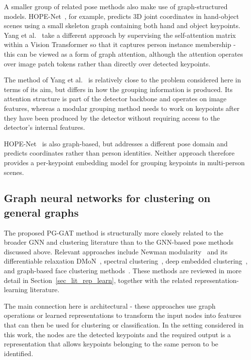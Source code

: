 A smaller group of related pose methods also make use of graph-structured models.
HOPE-Net~\cite{doosti2020hopenet}, for example,
predicts 3D joint coordinates in hand-object scenes
using a small skeleton graph containing both hand and object keypoints.
Yang et al.~\cite{yang2023instanceaware} take a different approach
by supervising the self-attention matrix within a Vision Transformer
so that it captures person instance membership -
this can be viewed as a form of graph attention,
although the attention operates over image patch tokens rather than directly over detected keypoints.

The method of Yang et al.~\cite{yang2023instanceaware}
is relatively close to the problem considered here in terms of its aim,
but differs in how the grouping information is produced.
Its attention structure is part of the detector backbone and operates on image features,
whereas a modular grouping method needs to work on keypoints after they have been produced by the detector
without requiring access to the detector's internal features.

HOPE-Net~\cite{doosti2020hopenet} is also graph-based,
but addresses a different pose domain and predicts coordinates rather than person identities.
Neither approach therefore provides a per-keypoint embedding model for grouping keypoints in multi-person scenes.

\subsection{Graph neural networks for clustering on general graphs}
\label{sec_lit_gnn_pose_general}

The proposed PG-GAT method is structurally more closely related
to the broader GNN and clustering literature than to the GNN-based pose methods discussed above.
Relevant approaches include Newman modularity~\cite{newman2006modularity}
and its differentiable relaxation DMoN~\cite{tsitsulin2023dmon},
spectral clustering~\cite{shi2000ncut, vonluxburg2007spectral},
deep embedded clustering~\cite{xie2016dec},
and graph-based face clustering methods~\cite{yang2019face, yang2020gcnve}.
These methods are reviewed in more detail in Section~\ref{sec_lit_rep_learn},
together with the related representation-learning literature.

The main connection here is architectural -
these approaches use graph operations or learned representations
to transform the input nodes into features that can then be used for clustering or classification.
In the setting considered in this work,
the nodes are the detected keypoints
and the required output is a representation that allows keypoints belonging to the same person to be identified.


